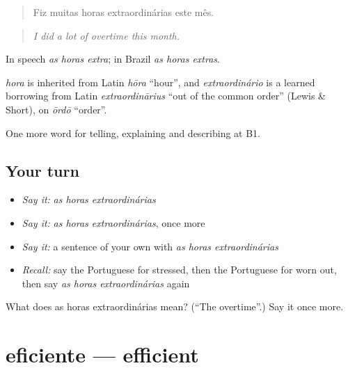 \begin{quote}
Fiz muitas horas extraordinárias este mês.
\end{quote}

\begin{quote}
\emph{I did a lot of overtime this month.}
\end{quote}

In speech \emph{as horas extra}; in Brazil \emph{as horas extras}.

\begin{cousinweb}
\emph{hora} is inherited from Latin \emph{hōra} \textquotedblleft{}hour\textquotedblright{}, and \emph{extraordinário} is a learned borrowing from Latin \emph{extraordinārius} \textquotedblleft{}out of the common order\textquotedblright{} (Lewis \& Short), on \emph{ōrdō} \textquotedblleft{}order\textquotedblright{}.
\end{cousinweb}

\begin{grammarlens}[title={What you've built}]
One more word for telling, explaining and describing at B1.
\end{grammarlens}

\subsection*{Your turn}
\begin{itemize}
\raggedright
  \item \emph{Say it:} \emph{as horas extraordinárias}
  \item \emph{Say it:} \emph{as horas extraordinárias}, once more
  \item \emph{Say it:} a sentence of your own with \emph{as horas extraordinárias}
  \item \emph{Recall:} say the Portuguese for stressed, then the Portuguese for worn out, then say \emph{as horas extraordinárias} again
\end{itemize}

\begin{tcolorbox}[breakable,colback=teal!4,colframe=teal!35!black,title={Before you move on}]
What does as horas extraordinárias mean? (\textquotedblleft{}The overtime\textquotedblright{}.) Say it once more.
\end{tcolorbox}
\section[eficiente]{eficiente — efficient}

